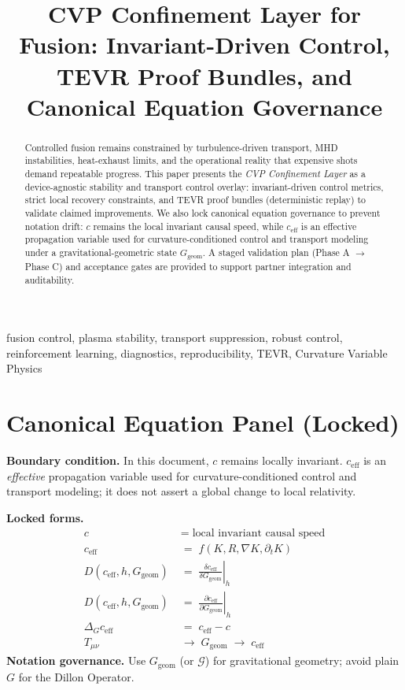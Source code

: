 \documentclass[conference]{IEEEtran}
\title{CVP Confinement Layer for Fusion: Invariant-Driven Control, TEVR Proof Bundles, and Canonical Equation Governance}
\author{\IEEEauthorblockN{Timothy J. Dillon}
\IEEEauthorblockA{206 Innovation Inc.\\
Bellevue, Washington, USA\\
\texttt{tjdillon@msn.com}}
}
\newcommand{\cEff}{c_{\mathrm{eff}}}
\newcommand{\Ggeom}{G_{\mathrm{geom}}}
\newcommand{\DeltaG}{\Delta_{G}}
\begin{document}
\maketitle

\begin{abstract}
Controlled fusion remains constrained by turbulence-driven transport, MHD instabilities, heat-exhaust limits, and the operational reality that expensive shots demand repeatable progress.
This paper presents the \emph{CVP Confinement Layer} as a device-agnostic stability and transport control overlay: invariant-driven control metrics, strict local recovery constraints, and TEVR proof bundles (deterministic replay) to validate claimed improvements.
We also lock canonical equation governance to prevent notation drift: $c$ remains the local invariant causal speed, while $\cEff$ is an effective propagation variable used for curvature-conditioned control and transport modeling under a gravitational-geometric state $\Ggeom$.
A staged validation plan (Phase A $\rightarrow$ Phase C) and acceptance gates are provided to support partner integration and auditability.
\end{abstract}

\begin{IEEEkeywords}
fusion control, plasma stability, transport suppression, robust control, reinforcement learning, diagnostics, reproducibility, TEVR, Curvature Variable Physics
\end{IEEEkeywords}

\section{Canonical Equation Panel (Locked)}
\noindent\textbf{Boundary condition.} In this document, $c$ remains locally invariant. $\cEff$ is an \emph{effective} propagation variable used for curvature-conditioned control and transport modeling; it does not assert a global change to local relativity.

\vspace{0.6em}
\noindent\textbf{Locked forms.}
\begin{align}
c &\;=\;\text{local invariant causal speed} \\
\cEff &\;=\; f\!\left(K, R, \nabla K, \partial_t K\right) \label{eq:ceff}\\
D(\cEff, h, \Ggeom) &\;=\;\left.\frac{\delta \cEff}{\delta \Ggeom}\right|_{h} \label{eq:operator_formal}\\
D(\cEff, h, \Ggeom) &\;=\;\left.\frac{\partial \cEff}{\partial \Ggeom}\right|_{h} \label{eq:operator_public}\\
\DeltaG \cEff &\;=\;\cEff - c \label{eq:delta}\\
T_{\mu\nu} &\;\rightarrow\; \Ggeom \;\rightarrow\; \cEff \label{eq:chain}
\end{align}
\noindent\textbf{Notation governance.} Use $\Ggeom$ (or $\mathcal{G}$) for gravitational geometry; avoid plain $G$ for the Dillon Operator.
\end{document}

